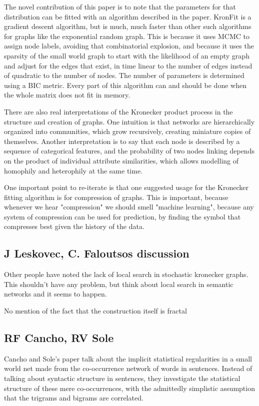 \documentclass[12pt]{article}
\begin{document}
The novel contribution of this paper is to note that the parameters for that distribution can be fitted with an algorithm described in the paper. KronFit is a gradient descent algorithm, but is much, much faster than other such algorithms for graphs like the exponential random graph. This is because it uses MCMC to assign node labels, avoiding that combinatorial explosion, and because it uses the sparsity of the small world graph to start with the likelihood of an empty graph and adjust for the edges that exist, in time linear to the number of edges instead of quadratic to the number of nodes. The number of parameters is determined using a BIC metric. Every part of this algorithm can and should be done when the whole matrix does not fit in memory.

There are also real interpretations of the Kronecker product process in the structure and creation of graphs. One intuition is that networks are hierarchically organized into communities, which grow recursively, creating miniature copies of themselves. Another interpretation is to say that each node is described by a sequence of categorical features, and the probability of two nodes linking depends on the product of individual attribute similarities, which allows modelling of homophily and heterophily at the same time.

One important point to re-iterate is that one suggested usage for the Kronecker fitting algorithm is for compression of graphs. This is important, because whenever we hear "compression" we should smell "machine learning", because any system of compression can be used for prediction, by finding the symbol that compresses best given the history of the data.
\subsection{J Leskovec, C. Faloutsos discussion}

Other people have noted the lack of local search in stochastic kronecker graphs. This shouldn't have any problem, but think about local search in semantic networks and it seems to happen.

No mention of the fact that the construction itself is fractal

\subsection{RF Cancho, RV Sole}
Cancho and Sole's paper talk about the implicit statistical regularities in a small world net made from the co-occurrence network of words in sentences. Instead of talking about syntactic structure in sentences, they investigate the statistical structure of these mere co-occurrences, with the admittedly simplistic assumption that the trigrams and bigrams are correlated.
\end{document}

